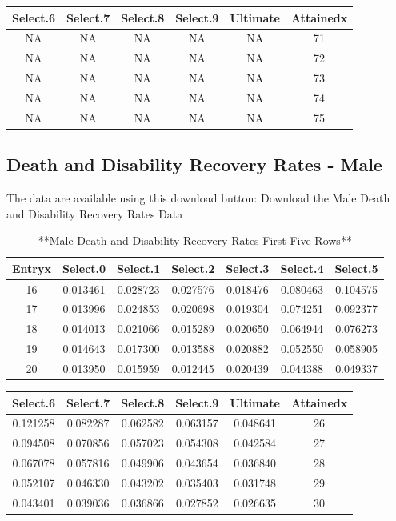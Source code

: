 \documentclass[
]{book}
\begin{document}
\begin{tabular}{c|c|c|c|c|c}
\hline
Select.6 & Select.7 & Select.8 & Select.9 & Ultimate & Attainedx\\
\hline
NA & NA & NA & NA & NA & 71\\
\hline
NA & NA & NA & NA & NA & 72\\
\hline
NA & NA & NA & NA & NA & 73\\
\hline
NA & NA & NA & NA & NA & 74\\
\hline
NA & NA & NA & NA & NA & 75\\
\hline
\end{tabular}

\hypertarget{death-and-disability-recovery-rates---male}{%
\subsection*{Death and Disability Recovery Rates - Male}\label{death-and-disability-recovery-rates---male}}

The data are available using this download button:
Download the Male Death and Disability Recovery Rates Data

\begin{table}

\caption{\label{tab:unnamed-chunk-40}**Male Death and Disability Recovery Rates First Five Rows**}
\centering
\begin{tabular}[t]{c|c|c|c|c|c|c}
\hline
Entryx & Select.0 & Select.1 & Select.2 & Select.3 & Select.4 & Select.5\\
\hline
16 & 0.013461 & 0.028723 & 0.027576 & 0.018476 & 0.080463 & 0.104575\\
\hline
17 & 0.013996 & 0.024853 & 0.020698 & 0.019304 & 0.074251 & 0.092377\\
\hline
18 & 0.014013 & 0.021066 & 0.015289 & 0.020650 & 0.064944 & 0.076273\\
\hline
19 & 0.014643 & 0.017300 & 0.013588 & 0.020882 & 0.052550 & 0.058905\\
\hline
20 & 0.013950 & 0.015959 & 0.012445 & 0.020439 & 0.044388 & 0.049337\\
\hline
\end{tabular}
\end{table}

\begin{tabular}{c|c|c|c|c|c}
\hline
Select.6 & Select.7 & Select.8 & Select.9 & Ultimate & Attainedx\\
\hline
0.121258 & 0.082287 & 0.062582 & 0.063157 & 0.048641 & 26\\
\hline
0.094508 & 0.070856 & 0.057023 & 0.054308 & 0.042584 & 27\\
\hline
0.067078 & 0.057816 & 0.049906 & 0.043654 & 0.036840 & 28\\
\hline
0.052107 & 0.046330 & 0.043202 & 0.035403 & 0.031748 & 29\\
\hline
0.043401 & 0.039036 & 0.036866 & 0.027852 & 0.026635 & 30\\
\hline
\end{tabular}
\end{document}
